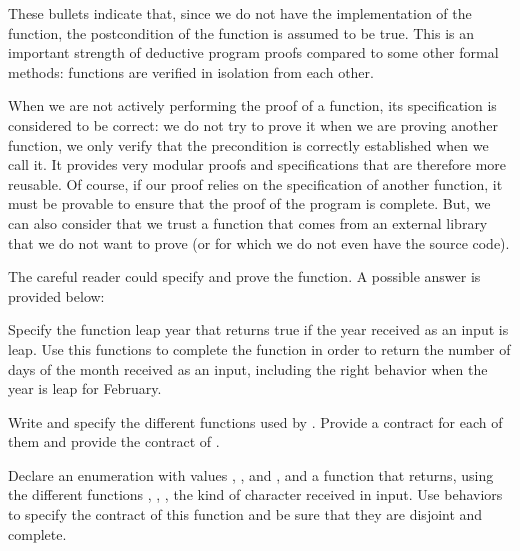 

These bullets indicate that, since we do not have the implementation
of the function, the postcondition of the function is assumed to be
true. This is an important strength of deductive program proofs
compared to some other formal methods: functions are verified in
isolation from each other.

When we are not actively performing the proof of a function, its
specification is considered to be correct: we do not try to prove it
when we are proving another function, we only verify that the
precondition is correctly established when we call it. It provides very
modular proofs and specifications that are therefore more reusable. Of
course, if our proof relies on the specification of another function, it
must be provable to ensure that the proof of the program is complete.
But, we can also consider that we trust a function that comes from an
external library that we do not want to prove (or for which we do not
even have the source code).

The careful reader could specify and prove the 
function. A possible answer is provided below:








\label{l4:contract-modularity-ex-days-of-month}


Specify the function leap year that returns true if the year received
as an input is leap. Use this functions to complete the function
 in order to return the number of days of the
month received as an input, including the right behavior when the year
is leap for February.





\label{l4:contract-modularity-ex-alpha-num}


Write and specify the different functions used by
. Provide a contract for each of them and
provide the contract of .





Declare an enumeration with values , ,
 and , and a function
 that returns, using the different
functions , ,
, the kind of character received in input. Use
behaviors to specify the contract of this function and be sure that
they are disjoint and complete.




